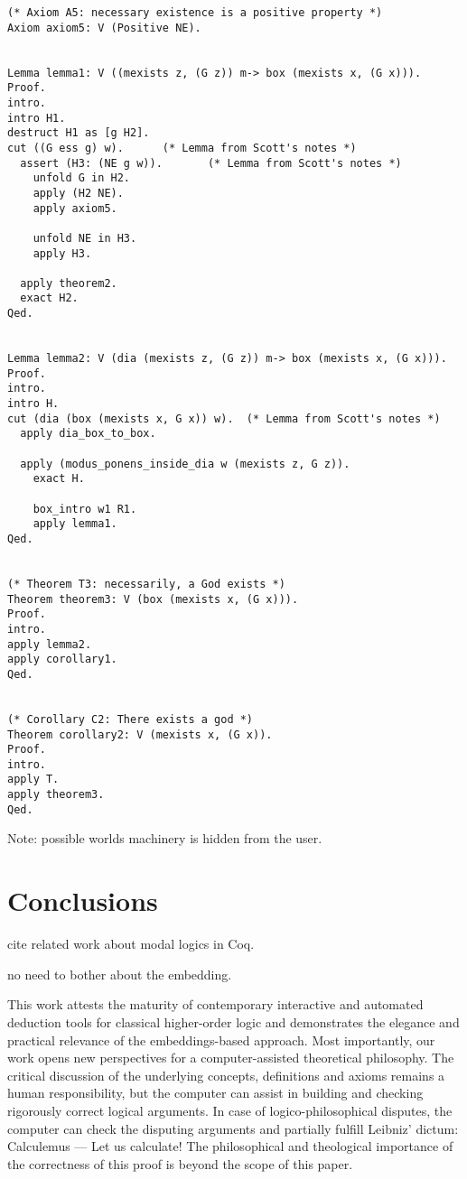 \documentclass{llncs}
\begin{document}
\begin{verbatim}
(* Axiom A5: necessary existence is a positive property *)
Axiom axiom5: V (Positive NE).


Lemma lemma1: V ((mexists z, (G z)) m-> box (mexists x, (G x))).
Proof.
intro.
intro H1.
destruct H1 as [g H2].
cut ((G ess g) w).      (* Lemma from Scott's notes *)
  assert (H3: (NE g w)).       (* Lemma from Scott's notes *)
    unfold G in H2.
    apply (H2 NE).
    apply axiom5.

    unfold NE in H3.
    apply H3.

  apply theorem2.
  exact H2.
Qed.


Lemma lemma2: V (dia (mexists z, (G z)) m-> box (mexists x, (G x))).
Proof.
intro.
intro H.
cut (dia (box (mexists x, G x)) w).  (* Lemma from Scott's notes *)
  apply dia_box_to_box.

  apply (modus_ponens_inside_dia w (mexists z, G z)).
    exact H.
       
    box_intro w1 R1.
    apply lemma1.
Qed.


(* Theorem T3: necessarily, a God exists *)
Theorem theorem3: V (box (mexists x, (G x))).
Proof.
intro.
apply lemma2.
apply corollary1.
Qed.


(* Corollary C2: There exists a god *)
Theorem corollary2: V (mexists x, (G x)).
Proof.
intro.
apply T.
apply theorem3.
Qed.
\end{verbatim}


Note: possible worlds machinery is hidden from the user.

\section{Conclusions}
\label{sec:conclusions}

cite related work about modal logics in Coq.

no need to bother about the embedding.

This work attests the maturity of contemporary interactive and
automated deduction tools for classical higher-order logic and
demonstrates the elegance and practical relevance of the
embeddings-based approach.  Most importantly, our work opens new
perspectives for a computer-assisted theoretical philosophy.  The
critical discussion of the underlying concepts, definitions and axioms
remains a human responsibility, but the computer can assist in
building and checking rigorously correct logical arguments. In case of
logico-philosophical disputes, the computer can check the disputing
arguments and partially fulfill Leibniz' dictum: Calculemus --- Let us
calculate!
The philosophical and theological importance of the correctness of this proof is beyond the scope of this paper.
\end{document}
